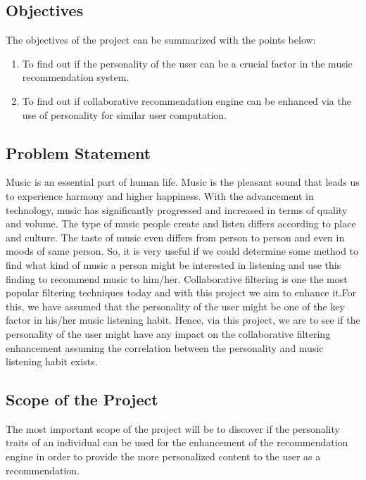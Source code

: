 \subsection{Objectives}
The objectives of the project can be summarized with the points below:
\begin{enumerate}
\item To find out if the personality of the user can be a crucial factor in the music recommendation system.
\item To find out if collaborative recommendation engine can be enhanced via the use of personality for similar user computation.
\end{enumerate}

\subsection{Problem Statement}
Music is an essential part of human life. Music is the pleasant sound that leads us to experience harmony and higher happiness. With the advancement in technology, music has significantly progressed and increased in terms of quality and volume. The type of music people create and listen differs according to place and culture. The taste of music even differs from person to person and even in moods of same person. So, it is very useful if we could determine some method to find what kind of music a person might be interested in listening and use this finding to recommend music to him/her. Collaborative filtering is one the most popular filtering techniques today and with this project we aim to enhance it.For this, we have assumed that the personality of the user might be one of the key factor in his/her music listening habit. Hence, via this project, we are to see if the personality of the user might have any impact on the collaborative filtering enhancement assuming the correlation between the personality and music listening habit exists.

\subsection{Scope of the Project}
The most important scope of the project will be to discover if the personality traits of an individual can be used for the enhancement of the recommendation engine in order to provide the more personalized content to the user as a recommendation.

